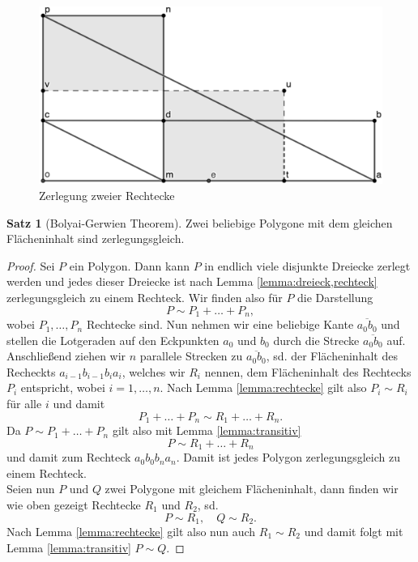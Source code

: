 \documentclass[11pt,titlepage]{article}
\theoremstyle{definition}
\newtheorem{theorem}{Satz}[section]
\theoremstyle{remark}
\begin{document}
	\begin{figure}[!htbp]
		\centering
		\includegraphics[scale=0.8]{Rechteck2}
		\caption{Zerlegung zweier Rechtecke}
		\label{Abb.3}
	\end{figure}
	
	\begin{theorem}[Bolyai-Gerwien Theorem] \label{theorem:bolyai-gerwien}
		Zwei beliebige Polygone mit dem gleichen Flächeninhalt sind zerlegungsgleich.
	\end{theorem}
	
	\begin{proof}
		Sei $P$ ein Polygon. Dann kann $P$ in endlich viele disjunkte Dreiecke zerlegt werden und jedes dieser 
		Dreiecke ist nach Lemma \ref{lemma:dreieck,rechteck} zerlegungsgleich zu einem Rechteck. Wir finden 
		also für $P$ die Darstellung
		\[ P\sim P_1+\ldots+P_n,\]
		wobei $P_1,\ldots,P_n$ Rechtecke sind. Nun nehmen wir eine beliebige Kante $\overline{a_0b_0}$ und 
		stellen die Lotgeraden auf den Eckpunkten $a_0$ und $b_0$ durch die Strecke $\overline{a_0b_0}$ 
		auf. Anschließend ziehen wir $n$ 
		parallele Strecken zu $\overline{a_0b_0}$, sd. der Flächeninhalt des Recheckts $a_{i-1}b_{i-1}b_ia_i$, 
		welches wir $R_i$ nennen, dem Flächeninhalt des Rechtecks $P_i$ entspricht, wobei $i=1,\ldots,n$. 
		Nach Lemma \ref{lemma:rechtecke} gilt also $P_i\sim R_i$ für alle $i$ und damit
		\[ P_1+\ldots+P_n\sim R_1+\ldots+R_n. \]
		Da $P\sim P_1+\ldots+P_n$ gilt also mit Lemma \ref{lemma:transitiv}
		\[ P\sim R_1+\ldots+R_n\]
		und damit zum Rechteck $a_0b_0b_na_n$. Damit ist jedes Polygon zerlegungsgleich zu einem Rechteck. \\
		Seien nun $P$ und $Q$ zwei Polygone mit gleichem Flächeninhalt, dann finden wir wie oben gezeigt 
		Rechtecke $R_1$ und $R_2$, sd.
		\[ P\sim R_1,\quad Q\sim R_2.\]
		Nach Lemma \ref{lemma:rechtecke} gilt also nun auch $R_1\sim R_2$ und damit folgt mit Lemma 
		\ref{lemma:transitiv} $P\sim Q$.
	\end{proof}
	
\end{document}
